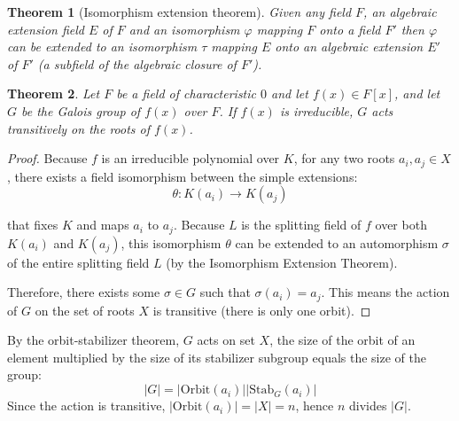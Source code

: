 \documentclass{article}
\newtheorem{theorem}{Theorem}[section]
\theoremstyle{definition}
\theoremstyle{remark}
\begin{document}
\begin{theorem}[Isomorphism extension theorem]
Given any field $F$, an algebraic extension field $E$ of $F$ and an isomorphism $\varphi$ mapping $F$ onto a field $F'$ then $\varphi$ can be extended to an isomorphism $\tau$ mapping $E$ onto an algebraic extension $E'$ of $F'$ (a subfield of the algebraic closure of $F'$). 
\end{theorem}
\begin{theorem}
Let $F$ be a field of characteristic $0$ and let $f(x)\in F[x]$, and let $G$ be the Galois group of $f(x)$ over $F$. If $f(x)$ is irreducible, $G$ acts transitively on the roots of $f(x)$.
\end{theorem}
\begin{proof}
Because $f$ is an irreducible polynomial over $K$, for any two roots $a_i,a_j\in X$, there exists a field isomorphism between the simple extensions:
$$\theta:K(a_i)\rightarrow K(a_j)$$

that fixes $K$ and maps $a_i$ to $a_j$.
Because $L$ is the splitting field of $f$ over both $K(a_i)$ and $K(a_j)$, this isomorphism $\theta$ can be extended to an automorphism $\sigma$ of the entire splitting field $L$ (by the Isomorphism Extension Theorem).

Therefore, there exists some $\sigma \in G$ such that $\sigma(a_i)=a_j$. This means the action of $G$ on the set of roots $X$ is transitive (there is only one orbit).
\end{proof}

By the orbit-stabilizer theorem, $G$ acts on set $X$, the size of the orbit of an element multiplied by the size of its stabilizer subgroup equals the size of the group:
\[|G|=|\mathrm{Orbit}(a_i)||\mathrm{Stab}_G(a_i)|\]
Since the action is transitive, $|\mathrm{Orbit}(a_i)|=|X|=n$, hence $n$ divides $|G|$.







\setcounter{section}{2}
\end{document}
